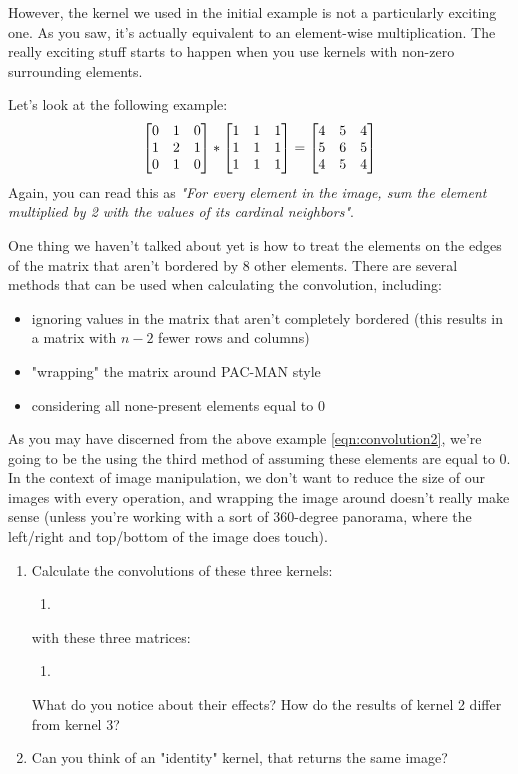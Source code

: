 \documentclass{tufte-handout}
\begin{document}
However, the kernel we used in the initial example is not a particularly exciting one. As you saw, it's actually equivalent to an element-wise multiplication. The really exciting stuff starts to happen when you use kernels with non-zero surrounding elements.

Let's look at the following example:
\begin{align}\label{eqn:convolution2}
    \begin{bmatrix} 0 & 1 & 0 \\ 1 & 2 & 1 \\ 0 & 1 & 0 \end{bmatrix} * \begin{bmatrix} 1 & 1 & 1 \\ 1 & 1 & 1 \\ 1 & 1 & 1 \end{bmatrix} =
    \begin{bmatrix} 4 & 5 & 4 \\ 5 & 6 & 5 \\ 4 & 5 & 4 \end{bmatrix}
\end{align}
Again, you can read this as \emph{"For every element in the image, sum the element multiplied by 2 with the values of its cardinal neighbors"}.

One thing we haven't talked about yet is how to treat the elements on the edges of the matrix that aren't bordered by 8 other elements. There are several methods that can be used when calculating the convolution, including:
\begin{itemize}
    \item ignoring values in the matrix that aren't completely bordered (this results in a matrix with $n-2$ fewer rows and columns)
    \item "wrapping" the matrix around PAC-MAN style
    \item considering all none-present elements equal to 0
\end{itemize}
As you may have discerned from the above example \eqref{eqn:convolution2}, we're going to be the using the third method of assuming these elements are equal to 0. In the context of image manipulation, we don't want to reduce the size of our images with every operation, and wrapping the image around doesn't really make sense (unless you're working with a sort of 360-degree panorama, where the left/right and top/bottom of the image does touch).

\begin{enumerate}
\item Calculate the convolutions of these three kernels:
    \begin{enumerate}
        \item
    \end{enumerate}
    with these three matrices:
    \begin{enumerate}
        \item
    \end{enumerate}
    What do you notice about their effects? How do the results of kernel 2 differ from kernel 3?
\item Can you think of an "identity" kernel, that returns the same image?

\end{enumerate}
\end{document}

